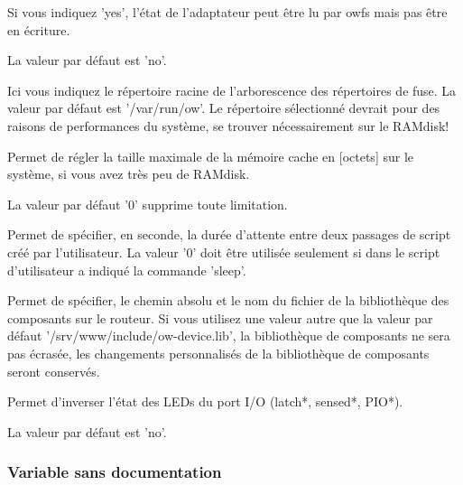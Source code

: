 \begin{description}
 Si vous indiquez 'yes', l'état de l'adaptateur peut être lu par owfs
 mais pas être en écriture.

La valeur par défaut est 'no'.

 Ici vous indiquez le répertoire racine de l'arborescence des répertoires de fuse.
 La valeur par défaut est '/var/run/ow'. Le répertoire sélectionné devrait pour
 des raisons de performances du système, se trouver nécessairement sur le RAMdisk!

 Permet de régler la taille maximale de la mémoire cache en [octets] sur le système,
 si vous avez très peu de RAMdisk.

 La valeur par défaut '0' supprime toute limitation.

 Permet de spécifier, en seconde, la durée d'attente entre deux passages de script créé
 par l'utilisateur. La valeur '0' doit être utilisée seulement si dans le script
 d'utilisateur a indiqué la commande 'sleep'.

 Permet de spécifier, le chemin absolu et le nom du fichier de la bibliothèque des composants
 sur le routeur. Si vous utilisez une valeur autre que la valeur par défaut
 '/srv/www/include/ow-device.lib', la bibliothèque de composants ne sera pas écrasée,
 les changements personnalisés de la bibliothèque de composants seront conservés.

 Permet d'inverser l'état des LEDs du port I/O (latch*, sensed*, PIO*).

La valeur par défaut est 'no'.
\end{description}

\subsubsection{Variable sans documentation}

